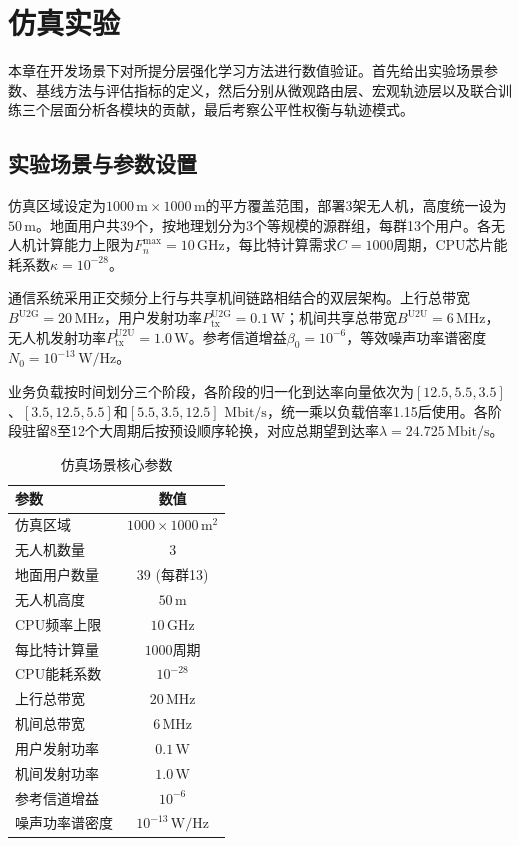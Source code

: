 
\section{仿真实验}
\label{sec:experiments}

本章在开发场景下对所提分层强化学习方法进行数值验证。首先给出实验场景参数、基线方法与评估指标的定义，然后分别从微观路由层、宏观轨迹层以及联合训练三个层面分析各模块的贡献，最后考察公平性权衡与轨迹模式。

\subsection{实验场景与参数设置}
\label{ssec:scenario}

仿真区域设定为$1000\,\mathrm{m}\times1000\,\mathrm{m}$的平方覆盖范围，部署3架无人机，高度统一设为$50\,\mathrm{m}$。地面用户共39个，按地理划分为3个等规模的源群组，每群13个用户。各无人机计算能力上限为$F_n^{\max}=10\,\mathrm{GHz}$，每比特计算需求$C=1000$周期，CPU芯片能耗系数$\kappa=10^{-28}$。

通信系统采用正交频分上行与共享机间链路相结合的双层架构。上行总带宽$B^{\mathrm{U2G}}=20\,\mathrm{MHz}$，用户发射功率$P_{\mathrm{tx}}^{\mathrm{U2G}}=0.1\,\mathrm{W}$；机间共享总带宽$B^{\mathrm{U2U}}=6\,\mathrm{MHz}$，无人机发射功率$P_{\mathrm{tx}}^{\mathrm{U2U}}=1.0\,\mathrm{W}$。参考信道增益$\beta_0=10^{-6}$，等效噪声功率谱密度$N_0=10^{-13}\,\mathrm{W/Hz}$。

业务负载按时间划分三个阶段，各阶段的归一化到达率向量依次为$[12.5,5.5,3.5]$、$[3.5,12.5,5.5]$和$[5.5,3.5,12.5]$ $\mathrm{Mbit/s}$，统一乘以负载倍率1.15后使用。各阶段驻留8至12个大周期后按预设顺序轮换，对应总期望到达率$\lambda=24.725\,\mathrm{Mbit/s}$。

\begin{table}[htbp]
\centering
\caption{仿真场景核心参数}
\label{tab:scenario_params}
\begin{tabular}{lc}
\toprule
参数 & 数值 \\
\midrule
仿真区域 & $1000\times1000\,\mathrm{m}^2$ \\
无人机数量 & 3 \\
地面用户数量 & 39 (每群13) \\
无人机高度 & $50\,\mathrm{m}$ \\
CPU频率上限 & $10\,\mathrm{GHz}$ \\
每比特计算量 & $1000$周期 \\
CPU能耗系数 & $10^{-28}$ \\
上行总带宽 & $20\,\mathrm{MHz}$ \\
机间总带宽 & $6\,\mathrm{MHz}$ \\
用户发射功率 & $0.1\,\mathrm{W}$ \\
机间发射功率 & $1.0\,\mathrm{W}$ \\
参考信道增益 & $10^{-6}$ \\
噪声功率谱密度 & $10^{-13}\,\mathrm{W/Hz}$ \\
\bottomrule
\end{tabular}
\end{table}


